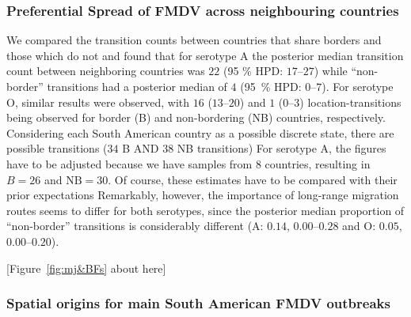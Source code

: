 \documentclass[10pt]{article}
\begin{document}
\subsubsection*{Preferential Spread of FMDV across neighbouring countries}
We compared the transition counts between countries that share borders and those which do not and found that for serotype A the posterior median transition count between neighboring countries was  $22$ (95 \% HPD: $17$--$27$) while ``non-border'' transitions had a posterior median of $4$ (95~\% HPD: $0$--$7$). For serotype O, similar results were observed, with $16$ ($13$--$20$) and $1$ ($0$--$3$) location-transitions being observed for border (B) and non-bordering (NB) countries, respectively.
Considering each South American country as a possible discrete state, there are  possible transitions ($34$ B AND $38$ NB transitions)
For serotype A, the figures have to be adjusted because we have samples from $8$ countries, resulting in $B = 26$ and $ \text{NB} = 30$.
Of course, these estimates have to be compared with their prior expectations
Remarkably, however, the importance of long-range migration routes seems to differ for both serotypes, since the posterior median proportion of ``non-border'' transitions is considerably different (A: $0.14$, $0.00$--$0.28$  and O: $0.05$, $0.00$--$0.20$).

\begin{center}
 [Figure~\ref{fig:mj&BFs} about here]
\end{center}

\subsubsection*{Spatial origins for main South American FMDV outbreaks}
\end{document}
